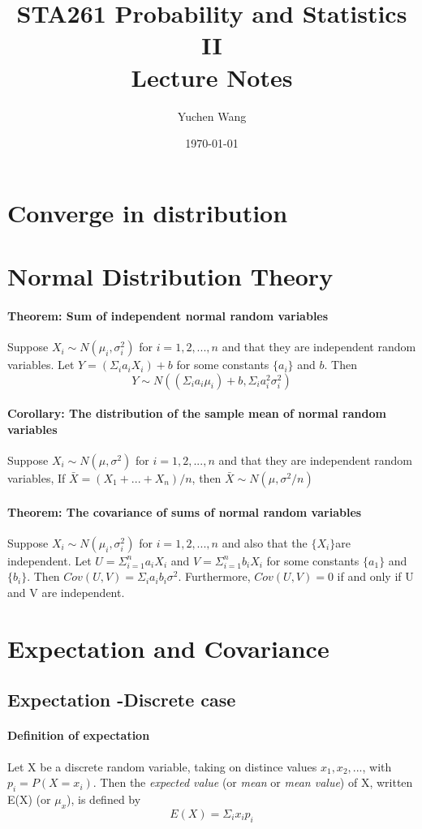 \documentclass[11pt]{article}
\title{STA261 Probability and Statistics II \\ Lecture Notes}
\author{Yuchen Wang}
\date{\today}
\newcommand{\ti}[1]{\textit{#1}}
\begin{document}
	\maketitle
	\tableofcontents
	\newpage
\section{Converge in distribution}
\section{Normal Distribution Theory}
\paragraph{Theorem: Sum of independent normal random variables}
Suppose $X_i \sim N(\mu_i, \sigma^2_i)$ for $i = 1, 2,...,n$ and that they are independent random variables. Let $Y = (\Sigma_ia_iX_i) + b$ for some constants $\{a_i\}$ and $b$. Then
$$Y \sim N((\Sigma_ia_i\mu_i)+b, \Sigma_ia^2_i\sigma^2_i)$$
\paragraph{Corollary: The distribution of the sample mean of normal random variables} Suppose $X_i \sim N(\mu, \sigma^2)$ for $i=1,2,...,n$ and that they are independent random variables, If $\bar X = (X_1 + ... +X_n)/n$, then $\bar X \sim N(\mu,\sigma^2/n)$
\paragraph{Theorem: The covariance of sums of normal random variables}Suppose $X_i \sim N(\mu_i, \sigma_i^2)$ for $i=1,2,...,n$ and also that the $\{X_i\} $are independent. Let $U=\Sigma^n_{i=1}a_iX_i$ and $V=\Sigma^n_{i=1}b_iX_i$ for some constants $\{a_1\}$ and $\{b_i\}$. Then $Cov(U,V) = \Sigma_ia_ib_i\sigma^2$. Furthermore, $Cov(U,V) = 0$ if and only if U and V are independent.

\section{Expectation and Covariance}
\subsection{Expectation -Discrete case}
\paragraph{Definition of expectation} Let X be a discrete random variable, taking on distince values $x_1,x_2,...$, with $p_i = P(X = x_i)$. Then the \ti{expected value} (or \ti{mean} or \ti{mean value}) of X, written E(X) (or $\mu_x$), is defined by $$E(X) = \Sigma_i x_ip_i$$
\end{document}
